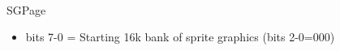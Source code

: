 \\
SGPage
\begin{itemize}
\item bits 7-0 = Starting 16k bank of sprite graphics (bits 2-0=000)
\end{itemize}

